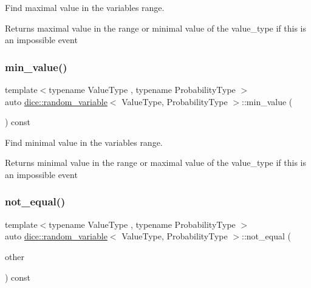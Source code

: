 Find maximal value in the variable\textquotesingle{}s range. 

\begin{DoxyReturn}{Returns}
maximal value in the range or minimal value of the value\+\_\+type if this is an impossible event 
\end{DoxyReturn}
\mbox{\label{classdice_1_1random__variable_ab926693f2773202c8fce755d4664052f}} 
\subsubsection{\texorpdfstring{min\+\_\+value()}{min\_value()}}
{\footnotesize\ttfamily template$<$typename Value\+Type , typename Probability\+Type $>$ \\
auto \mbox{\hyperlink{classdice_1_1random__variable}{dice\+::random\+\_\+variable}}$<$ Value\+Type, Probability\+Type $>$\+::min\+\_\+value (\begin{DoxyParamCaption}{ }\end{DoxyParamCaption}) const\hspace{0.3cm}{\ttfamily [inline]}}



Find minimal value in the variable\textquotesingle{}s range. 

\begin{DoxyReturn}{Returns}
minimal value in the range or maximal value of the value\+\_\+type if this is an impossible event 
\end{DoxyReturn}
\mbox{\label{classdice_1_1random__variable_aeeabefcda0c3599eba97b98fab245021}} 
\subsubsection{\texorpdfstring{not\+\_\+equal()}{not\_equal()}}
{\footnotesize\ttfamily template$<$typename Value\+Type , typename Probability\+Type $>$ \\
auto \mbox{\hyperlink{classdice_1_1random__variable}{dice\+::random\+\_\+variable}}$<$ Value\+Type, Probability\+Type $>$\+::not\+\_\+equal (\begin{DoxyParamCaption}\item[{const \mbox{\hyperlink{classdice_1_1random__variable}{random\+\_\+variable}}$<$ Value\+Type, Probability\+Type $>$ \&}]{other }\end{DoxyParamCaption}) const\hspace{0.3cm}{\ttfamily [inline]}}




